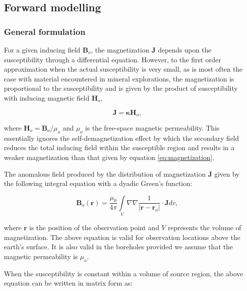 \subsection{Forward modelling}
\subsubsection{General formulation}

For a given inducing field $\mathbf{B}_o$, the magnetization $\mathbf{J}$ depends upon the susceptibility through a differential equation. However, to the first order approximation when the actual susceptibility is very small, as is most often the case with material encountered in mineral explorations, the magnetization  is proportional to the susceptibility and is given by the product of susceptibility with inducing magnetic field $\mathbf{H}_o$,

\begin{equation}
\label{eq:magnetization}
\mathbf{J}=\bm{\kappa}\mathbf{H}_o,
\end{equation}

where $\mathbf{H}_o=\mathbf{B}_o / \mu_o$ and $\mu_o$ is the free-space magnetic permeability. This essentially ignores the self-demagnetization effect by which the secondary field reduces the total inducing field within the susceptible region and results in a weaker magnetization than that given by equation \ref{eq:magnetization}.

The anomalous field produced by the distribution of magnetization $\mathbf{J}$ given by the following integral equation with a dyadic Green's function:

\begin{equation}
\label{eq:greensf}
\mathbf{B}_a(\mathbf{r})=\frac{\mu_0}{4\pi}\int\limits_V \nabla \nabla \frac{1}{\left |\mathbf{r}-\mathbf{r}_o\right |}\cdot\mathbf{J} dv,
\end{equation}

where $\mathbf{r}$ is the position of the observation point and $V$ represents the volume of magnetization. The above equation is valid for observation locations above the earth's surface. It is also valid in the boreholes provided we assume that the magnetic permeability is $\mu_o$.

When the susceptibility is constant within a volume of source region, the above equation can be written in matrix form as:

